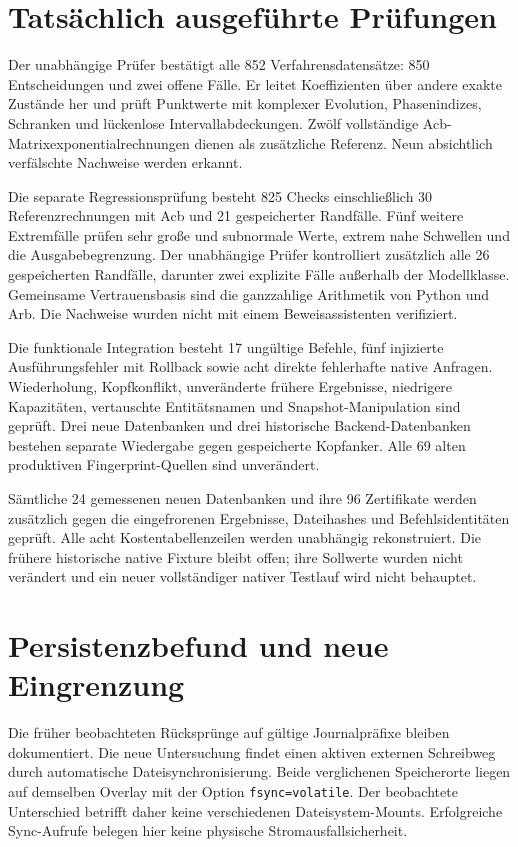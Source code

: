\documentclass[11pt,a4paper]{article}
\begin{document}
\section*{Tatsächlich ausgeführte Prüfungen}
Der unabhängige Prüfer bestätigt alle 852 Verfahrensdatensätze: 850 Entscheidungen und zwei offene Fälle. Er leitet Koeffizienten über andere exakte Zustände her und prüft Punktwerte mit komplexer Evolution, Phasenindizes, Schranken und lückenlose Intervallabdeckungen. Zwölf vollständige Acb-Matrixexponentialrechnungen dienen als zusätzliche Referenz. Neun absichtlich verfälschte Nachweise werden erkannt.

Die separate Regressionsprüfung besteht 825 Checks einschließlich 30 Referenzrechnungen mit Acb und 21 gespeicherter Randfälle. Fünf weitere Extremfälle prüfen sehr große und subnormale Werte, extrem nahe Schwellen und die Ausgabebegrenzung. Der unabhängige Prüfer kontrolliert zusätzlich alle 26 gespeicherten Randfälle, darunter zwei explizite Fälle außerhalb der Modellklasse. Gemeinsame Vertrauensbasis sind die ganzzahlige Arithmetik von Python und Arb. Die Nachweise wurden nicht mit einem Beweisassistenten verifiziert.

Die funktionale Integration besteht 17 ungültige Befehle, fünf injizierte Ausführungsfehler mit Rollback sowie acht direkte fehlerhafte native Anfragen. Wiederholung, Kopfkonflikt, unveränderte frühere Ergebnisse, niedrigere Kapazitäten, vertauschte Entitätsnamen und Snapshot-Manipulation sind geprüft. Drei neue Datenbanken und drei historische Backend-Datenbanken bestehen separate Wiedergabe gegen gespeicherte Kopfanker. Alle 69 alten produktiven Fingerprint-Quellen sind unverändert.

Sämtliche 24 gemessenen neuen Datenbanken und ihre 96 Zertifikate werden zusätzlich gegen die eingefrorenen Ergebnisse, Dateihashes und Befehlsidentitäten geprüft. Alle acht Kostentabellenzeilen werden unabhängig rekonstruiert. Die frühere historische native Fixture bleibt offen; ihre Sollwerte wurden nicht verändert und ein neuer vollständiger nativer Testlauf wird nicht behauptet.

\newpage
\section*{Persistenzbefund und neue Eingrenzung}
Die früher beobachteten Rücksprünge auf gültige Journalpräfixe bleiben dokumentiert. Die neue Untersuchung findet einen aktiven externen Schreibweg durch automatische Dateisynchronisierung. Beide verglichenen Speicherorte liegen auf demselben Overlay mit der Option \texttt{fsync=volatile}. Der beobachtete Unterschied betrifft daher keine verschiedenen Dateisystem-Mounts. Erfolgreiche Sync-Aufrufe belegen hier keine physische Stromausfallsicherheit.
\end{document}
